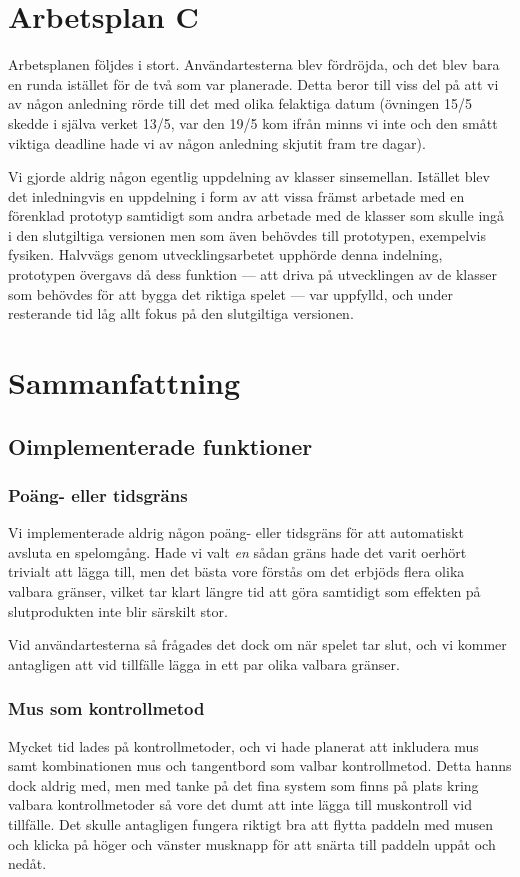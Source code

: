 \documentclass[a4paper,11pt]{article}
\begin{document}
\section{Arbetsplan C}
Arbetsplanen följdes i stort. Användartesterna blev fördröjda, och det blev bara en runda istället
för de två som var planerade. Detta beror till viss del på att vi av någon anledning rörde till det
med olika felaktiga datum (övningen 15/5 skedde i själva verket 13/5, var den 19/5 kom ifrån minns
vi inte och den smått viktiga deadline hade vi av någon anledning skjutit fram tre dagar).

\bigskip
\noindent
Vi gjorde aldrig någon egentlig uppdelning av klasser sinsemellan. Istället blev det inledningvis en
uppdelning i form av att vissa främst arbetade med en förenklad prototyp samtidigt som andra
arbetade med de klasser som skulle ingå i den slutgiltiga versionen men som även behövdes till
prototypen, exempelvis fysiken. Halvvägs genom utvecklingsarbetet upphörde denna indelning,
prototypen övergavs då dess funktion --- att driva på utvecklingen av de klasser som behövdes för att
bygga det riktiga spelet --- var uppfylld, och under resterande tid låg allt fokus på den
slutgiltiga versionen.

\section{Sammanfattning}
\subsection{Oimplementerade funktioner}
\subsubsection{Poäng- eller tidsgräns}
Vi implementerade aldrig någon poäng- eller tidsgräns för att automatiskt avsluta en spelomgång.
Hade vi valt \textit{en} sådan gräns hade det varit oerhört trivialt att lägga till, men det bästa
vore förstås om det erbjöds flera olika valbara gränser, vilket tar klart längre tid att göra
samtidigt som effekten på slutprodukten inte blir särskilt stor.

Vid användartesterna så frågades det dock om när spelet tar slut, och vi kommer antagligen att
vid tillfälle lägga in ett par olika valbara gränser.

\subsubsection{Mus som kontrollmetod}
Mycket tid lades på kontrollmetoder, och vi hade planerat att inkludera mus samt kombinationen mus
och tangentbord som valbar kontrollmetod. Detta hanns dock aldrig med, men med tanke på det fina
system som finns på plats kring valbara kontrollmetoder så vore det dumt att inte lägga till muskontroll
vid tillfälle. Det skulle antagligen fungera riktigt bra att flytta paddeln med musen och klicka
på höger och vänster musknapp för att snärta till paddeln uppåt och nedåt.
\end{document}
